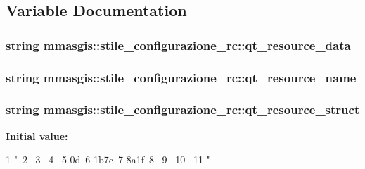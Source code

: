 \subsection{Variable Documentation}
\hypertarget{namespacemmasgis_1_1stile__configurazione__rc_a0c698360c599ea85940516e0038d06e1}{
\subsubsection[{qt\_\-resource\_\-data}]{\setlength{\rightskip}{0pt plus 5cm}string {\bf mmasgis::stile\_\-configurazione\_\-rc::qt\_\-resource\_\-data}}}
\label{namespacemmasgis_1_1stile__configurazione__rc_a0c698360c599ea85940516e0038d06e1}
\hypertarget{namespacemmasgis_1_1stile__configurazione__rc_a4c662a89368381187d1db8d6a15de9c7}{
\subsubsection[{qt\_\-resource\_\-name}]{\setlength{\rightskip}{0pt plus 5cm}string {\bf mmasgis::stile\_\-configurazione\_\-rc::qt\_\-resource\_\-name}}}
\label{namespacemmasgis_1_1stile__configurazione__rc_a4c662a89368381187d1db8d6a15de9c7}
\hypertarget{namespacemmasgis_1_1stile__configurazione__rc_ad1e87df11ed7cb89d08ea3e2a2218144}{
\subsubsection[{qt\_\-resource\_\-struct}]{\setlength{\rightskip}{0pt plus 5cm}string {\bf mmasgis::stile\_\-configurazione\_\-rc::qt\_\-resource\_\-struct}}}
\label{namespacemmasgis_1_1stile__configurazione__rc_ad1e87df11ed7cb89d08ea3e2a2218144}
{\bfseries Initial value:}
\begin{DoxyCode}
1 "\
2 \
3 \
4 \
5 \x0d\xbf\
6 \x1b\x7c\
7 \x8a\x1f\
8 \xce{}\
9 \
10 \
11 "
\end{DoxyCode}
